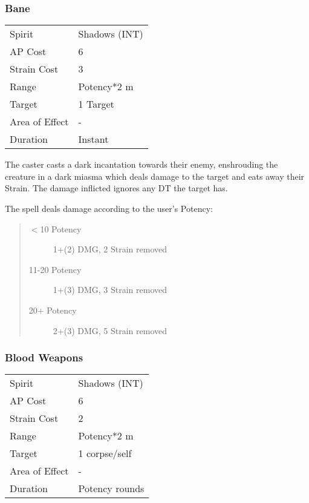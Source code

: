 \documentclass[11pt,a4paper,twocolumn]{book}
\begin{document}
\medskip


\subsubsection*{Bane}
{
	\begin{tabu} to 70mm{| X[l,4] | X[l,7] |}
		\hline
		Spirit         & Shadows (INT) \\
		AP Cost        & 6             \\
		Strain Cost    & 3             \\
		Range          & Potency*2 m   \\
		Target         & 1 Target      \\
		Area of Effect & -             \\
		Duration       & Instant       \\ \hline
	\end{tabu}
	
}
\medskip
The caster casts a dark incantation towards their enemy, enshrouding the creature in a dark miasma which deals damage to the target and eats away their Strain. The damage inflicted ignores any DT the target has.

The spell deals damage according to the user's Potency:
\begin{quote}
	\begin{description}
		\item[$<$10 Potency] 	1+(2) DMG, 2 Strain removed
		\item[11-20 Potency] 1+(3) DMG, 3 Strain removed
		\item[20+ Potency] 	    2+(3) DMG, 5 Strain removed
	\end{description}	
\end{quote}

\subsubsection*{Blood Weapons}
{
	\begin{tabu} to 75mm{| X[l,4] | X[l,7] |}
		\hline
		Spirit         & Shadows (INT)  \\
		AP Cost        & 6              \\
		Strain Cost    & 2              \\
		Range          & Potency*2 m    \\
		Target         & 1 corpse/self  \\
		Area of Effect & -              \\
		Duration       & Potency rounds \\ \hline
	\end{tabu}
	
}
\end{document}
